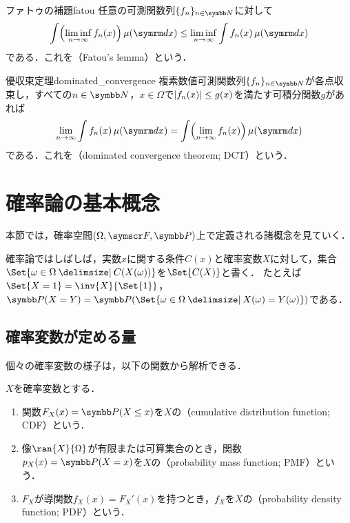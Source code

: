 \documentclass[../../main]{subfiles}
\begin{document}
\begin{theorem}{ファトゥの補題}{fatou}
  任意の可測関数列\(\seq{f_n}_{n\in\numset{N}}\)に対して
  \[
    \int\pqty*{\liminf_{n\to\infty}f_n(x)}\measured[x]{\mu} \leq \liminf_{n\to\infty}\int f_n(x)\measured[x]{\mu}
  \]
  である．これを（Fatou's lemma）という．
\end{theorem}

\begin{theorem}{優収束定理}{dominated_convergence}
  複素数値可測関数列\(\seq{f_n}_{n\in\numset{N}}\)が各点収束し，すべての\(n\in\numset{N}\)，\(x\in\Omega\)で\(\lvert f_n(x)\rvert\leq g(x)\)を満たす可積分関数\(g\)があれば
  \[
    \lim_{n\to\infty}\int f_n(x)\measured[x]{\mu} = \int\pqty*{\lim_{n\to\infty}f_n(x)}\measured[x]{\mu}
  \]
  である．これを（dominated convergence theorem; DCT）という．
\end{theorem}

\section{確率論の基本概念}

本節では，確率空間\((\Omega,\sigmaalg{F},\prob)\)上で定義される諸概念を見ていく．

確率論ではしばしば，実数\(x\)に関する条件\(C(x)\)と確率変数\(X\)に対して，集合\(\Set{\omega\in\Omega\given C(X(\omega))}\)を\(\Set{C(X)}\)と書く．
たとえば\(\Set{X=1}=\inv{X}{\Set{1}}\)，\(\prob(X=Y)=\prob(\Set{\omega\in\Omega\given X(\omega)=Y(\omega)})\)である．

\subsection{確率変数が定める量}

個々の確率変数の様子は，以下の関数から解析できる．

\begin{definition}{}{}
  \(X\)を確率変数とする．
  \begin{enumerate}
    \item 関数\(F_X(x)=\prob(X\leq x)\)を\(X\)の（cumulative distribution function; CDF）という．
    \item 像\(\ran{X}{\Omega}\)が有限または可算集合のとき，関数\(p_X(x)=\prob(X=x)\)を\(X\)の（probability mass function; PMF）という．
    \item \(F_X\)が導関数\(f_X(x)=F_X'(x)\)を持つとき，\(f_X\)を\(X\)の（probability density function; PDF）という\footnotemark．
  \end{enumerate}
\end{definition}
\end{document}
